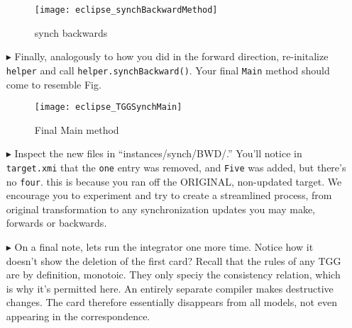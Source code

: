 \begin{itemize}
\begin{figure}[htbp]
\begin{center}
  \texttt{[image: eclipse\_synchBackwardMethod]}
  \caption{synch backwards}
  \label{eclipse:SynchBackwardMethod}
\end{center}
\end{figure}

\item[$\blacktriangleright$] Finally, analogously to how you did in the forward direction, re-initalize \texttt{helper} and call
\texttt{helper.synchBackward()}. Your final \texttt{Main} method should come to resemble Fig.

\begin{figure}[htbp]
\begin{center}
  \texttt{[image: eclipse\_TGGSynchMain]}
  \caption{Final Main method}
  \label{eclipse:TGGSynchMain}
\end{center}
\end{figure}

\item[$\blacktriangleright$] Inspect the new files in ``instances/synch/BWD/.'' You'll notice in \texttt{target.xmi} that the \texttt{one} entry was removed,
and \texttt{Five} was added, but there's no \texttt{four}. this is because you ran off the ORIGINAL, non-updated target. We encourage you to experiment and try
to create a streamlined process, from original transformation to any synchronization updates you may make, forwards or backwards.

\item[$\blacktriangleright$] On a final note, lets run the integrator one more time. Notice how it doesn't show the deletion of the first card? Recall that
the rules of any TGG are by definition, monotoic. They only speciy the consistency relation, which is why it's permitted here. An entirely separate compiler
makes destructive changes. The card therefore essentially disappears from all models, not even appearing in the correspondence.

\end{itemize}
